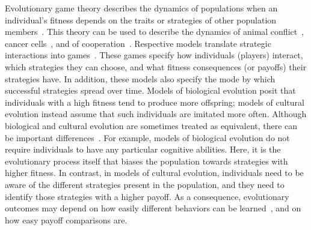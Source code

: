 \documentclass[11pt]{article}
\theoremstyle{plainCl1}
\theoremstyle{plainCl2}
\begin{document}
Evolutionary game theory describes the dynamics of populations when an individual's fitness depends on the traits or strategies of other population members~\cite{hofbauer1998evolutionary, nowak:Nature:2004, hauert2005game}.  
This theory can be used to describe the dynamics of animal conflict~\citep{maynard-smith:Nature:1973}, cancer cells~\citep{Stein:PTRS:2023}, and of cooperation~\citep{nowak:Science:2006}. 
Respective models translate strategic interactions into games~\cite{smith1982evolution}. 
These games specify how individuals (players) interact, which strategies they can choose, and what fitness consequences (or payoffs) their strategies have. 
In addition, these models also specify the mode by which successful strategies spread over time. 
Models of biological evolution posit that individuals with a high fitness tend to produce more offspring; models of cultural evolution instead assume that such individuals are imitated more often. 
Although biological and cultural evolution are sometimes treated as equivalent, there can be important differences~\citep{Wu2015,Smolla:PTRS:2021}. 
For example, models of biological evolution do not require individuals to have any particular cognitive abilities.
Here, it is the evolutionary process itself that biases the population towards strategies with higher fitness. 
In contrast, in models of cultural evolution, individuals need to be aware of the different strategies present in the population, and they need to identify those strategies with a higher payoff. 
As a consequence, evolutionary outcomes may depend on how easily different behaviors can be learned~\citep{Chatterjee:JTB:2012}, and on how easy payoff comparisons are. 

\end{document}
